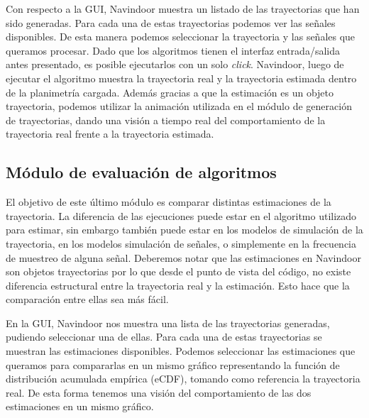 Con respecto a la GUI, Navindoor muestra un listado de las trayectorias que han sido generadas. Para cada una de estas trayectorias podemos ver las señales disponibles. De esta manera podemos seleccionar la trayectoria y las señales que queramos procesar. Dado que los algoritmos tienen el interfaz entrada/salida antes presentado, es posible ejecutarlos con un solo \emph{click}. Navindoor, luego de ejecutar el algoritmo muestra la trayectoria real y la trayectoria estimada dentro de la planimetría cargada. Además gracias a que la estimación es un objeto trayectoria, podemos utilizar la animación utilizada en el módulo de generación de trayectorias, dando una visión a tiempo real del comportamiento de la trayectoria real frente a la trayectoria estimada.



\subsection{Módulo de evaluación de algoritmos}

El objetivo de este último módulo es comparar distintas estimaciones de la trayectoria. La diferencia de las ejecuciones puede estar en el algoritmo utilizado para estimar, sin embargo también puede estar en los modelos de simulación de la trayectoria, en los modelos simulación de señales, o simplemente en la frecuencia de muestreo de alguna señal. Deberemos notar que las estimaciones en Navindoor son objetos trayectorias por lo que desde el punto de vista del código, no existe diferencia estructural entre la trayectoria real y la estimación. Esto hace que la comparación entre ellas sea más fácil.

En la GUI, Navindoor nos muestra una lista de las trayectorias generadas, pudiendo seleccionar una de ellas. Para cada una de estas trayectorias se muestran las estimaciones disponibles. Podemos seleccionar las estimaciones que queramos para compararlas en un mismo gráfico representando la función de distribución acumulada empírica (eCDF), tomando como referencia la trayectoria real. De esta forma tenemos una visión del comportamiento de las dos estimaciones en un mismo gráfico.
